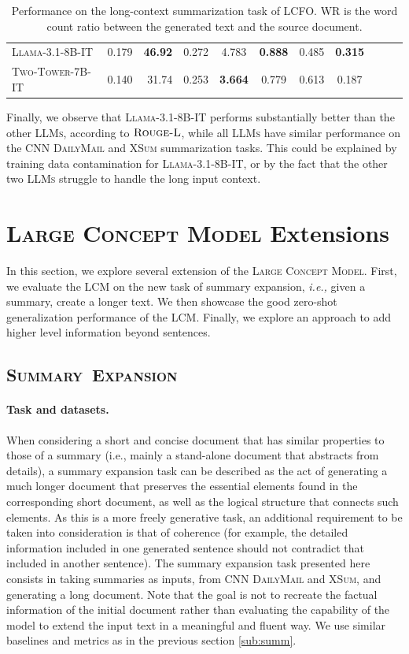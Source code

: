 \documentclass[twoside,11pt]{fairmeta}
\newcommand{\llms}{\textsc{LLMs}\xspace}
\newcommand{\llamaIT}{\textsc{Llama-3.1-8B-IT}\xspace}
\newcommand{\summaryexpansion}{\mbox{\textsc{Summary Expansion}}\xspace}
\newcommand{\lcm}{\textsc{LCM}\xspace}
\newcommand{\LCM}{\textsc{Large Concept Model}\xspace}
\newcommand{\IFTtwotower}{\textsc{Two-Tower-7B-IT}\xspace}
\newcommand{\cnndm}{\textsc{CNN DailyMail}\xspace}
\newcommand{\xsum}{\textsc{XSum}\xspace}
\newcommand{\rougellong}{\textsc{Rouge-L}\xspace}
\newcommand{\ie}{\textit{i.e.,}\xspace}
\begin{document}
\begin{table}[t!]
{\begin{tabular}{@{}lp{1.2cm}rcccccccc@{}}
\llamaIT & 0.179 & \textbf{46.92} & 0.272 & 4.783 & \textbf{0.888} & 0.485 & \textbf{0.315} \\
\cmidrule{0-10}


\IFTtwotower & 0.140 & 31.74 & 0.253 & \textbf{3.664} & 0.779 & 0.613 & 0.187 \\

\bottomrule
\end{tabular}%
}
\caption{\label{tabl:summ-long}Performance on the long-context summarization task of LCFO. WR is the word count ratio between the generated text and the source document.
}
\end{table}Finally, we observe that \llamaIT performs substantially better than the other \llms, according to $\rougellong$, while all \llms have similar performance on the \cnndm and \xsum summarization tasks. This could be explained by training data contamination for \llamaIT, or by the fact that the other two \llms struggle to handle the long input context.\FloatBarrier
\section{\LCM Extensions}

In this section, we explore several extension of the \LCM. First, we evaluate the \lcm on the new task of summary expansion, \ie given a summary, create a longer text. We then showcase the good zero-shot generalization performance of the \lcm. Finally, we explore an approach to add higher level information beyond sentences.

\subsection{\summaryexpansion}
\label{sub:summexp}

\paragraph{Task and datasets.}
When considering a short and concise document that has similar properties to those of a summary (i.e., mainly a stand-alone document that abstracts from details), a summary expansion task can be described as the act of generating a much longer document that preserves the essential elements found in the corresponding short document, as well as the logical structure that connects such elements. As this is a more freely generative task, an additional requirement to be taken into consideration is that of coherence (for example, the detailed information included in one generated sentence should not contradict that included in another sentence). The summary expansion task presented here consists in taking summaries as inputs, from \cnndm and \xsum, and generating a long document.
Note that the goal is not to recreate the factual information of the initial document rather than evaluating the capability of the model to extend the input text in a meaningful and fluent way.
We use similar baselines and metrics as in the previous section \ref{sub:summ}.
\end{document}
